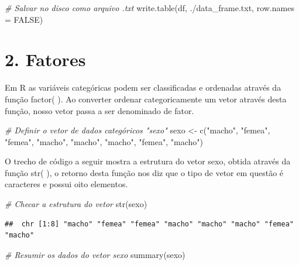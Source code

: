 \documentclass[
]{article}
\newenvironment{Shaded}{\begin{snugshade}}{\end{snugshade}}
\newcommand{\AttributeTok}[1]{\textcolor[rgb]{0.77,0.63,0.00}{#1}}
\newcommand{\CommentTok}[1]{\textcolor[rgb]{0.56,0.35,0.01}{\textit{#1}}}
\newcommand{\ConstantTok}[1]{\textcolor[rgb]{0.00,0.00,0.00}{#1}}
\newcommand{\FunctionTok}[1]{\textcolor[rgb]{0.00,0.00,0.00}{#1}}
\newcommand{\NormalTok}[1]{#1}
\newcommand{\OtherTok}[1]{\textcolor[rgb]{0.56,0.35,0.01}{#1}}
\newcommand{\StringTok}[1]{\textcolor[rgb]{0.31,0.60,0.02}{#1}}
\begin{document}
\begin{Shaded}
\begin{Highlighting}[]
\CommentTok{\# Salvar no disco como arquivo .txt}
\FunctionTok{write.table}\NormalTok{(df, }\StringTok{\textquotesingle{}./data\_frame.txt\textquotesingle{}}\NormalTok{, }\AttributeTok{row.names =} \ConstantTok{FALSE}\NormalTok{)}
\end{Highlighting}
\end{Shaded}

\hypertarget{fatores}{%
\section{2. Fatores}\label{fatores}}

Em R as variáveis categóricas podem ser classificadas e ordenadas
através da função factor( ). Ao converter ordenar categoricamente um
vetor através desta função, nosso vetor passa a ser denominado de fator.

\begin{Shaded}
\begin{Highlighting}[]
\CommentTok{\# Definir o vetor de dados categóricos "sexo"}
\NormalTok{sexo }\OtherTok{\textless{}{-}} \FunctionTok{c}\NormalTok{(}\StringTok{"macho"}\NormalTok{, }\StringTok{"femea"}\NormalTok{, }\StringTok{"femea"}\NormalTok{, }\StringTok{"macho"}\NormalTok{, }
          \StringTok{"macho"}\NormalTok{, }\StringTok{"macho"}\NormalTok{, }\StringTok{"femea"}\NormalTok{, }\StringTok{"macho"}\NormalTok{)}
\end{Highlighting}
\end{Shaded}

O trecho de código a seguir mostra a estrutura do vetor sexo, obtida
através da função str( ), o retorno desta função nos diz que o tipo de
vetor em questão é caracteres e possui oito elementos.

\begin{Shaded}
\begin{Highlighting}[]
\CommentTok{\# Checar a estrutura do vetor}
\FunctionTok{str}\NormalTok{(sexo)}
\end{Highlighting}
\end{Shaded}

\begin{verbatim}
##  chr [1:8] "macho" "femea" "femea" "macho" "macho" "macho" "femea" "macho"
\end{verbatim}

\begin{Shaded}
\begin{Highlighting}[]
\CommentTok{\# Resumir os dados do vetor sexo}
\FunctionTok{summary}\NormalTok{(sexo)}
\end{Highlighting}
\end{Shaded}
\end{document}
